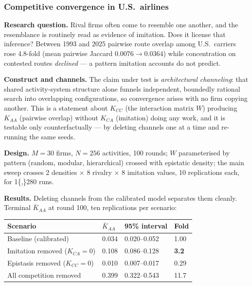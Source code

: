 \documentclass[
]{article}
\newcounter{none} %
\begin{document}
\subsubsection{Competitive convergence in
U.S.~airlines}\label{sec:app-airlines}

\textbf{Research question.} Rival firms often come to resemble one
another, and the resemblance is routinely read as evidence of imitation.
Does it license that inference? Between 1993 and 2025 pairwise route
overlap among U.S.~carriers rose 4.8-fold (mean pairwise Jaccard
\(0.0076 \rightarrow 0.0364\)) while concentration on contested routes
\emph{declined} --- a pattern imitation accounts do not predict.

\textbf{Construct and channels.} The claim under test is
\emph{architectural channeling}: that shared activity-system structure
alone funnels independent, boundedly rational search into overlapping
configurations, so convergence arises with no firm copying another. This
is a statement about \(K_{CC}\) (the interaction matrix \(W\)) producing
\(K_{AA}\) (pairwise overlap) without \(K_{CA}\) (imitation) doing any
work, and it is testable only counterfactually --- by deleting channels
one at a time and re-running the same seeds.

\textbf{Design.} \(M = 30\) firms, \(N = 256\) activities, 100 rounds;
\(W\) parameterised by pattern (random, modular, hierarchical) crossed
with epistatic density; the main sweep crosses 2 densities \(\times\) 8
rivalry \(\times\) 8 imitation values, 10 replications each, for
1\{,\}280 runs.

\textbf{Results.} Deleting channels from the calibrated model separates
them cleanly. Terminal \(\bar K_{AA}\) at round 100, ten replications
per scenario:

{\def\LTcaptype{none} %
\begin{longtable}[]{@{}llll@{}}
\toprule\noalign{}
Scenario & \(\bar K_{AA}\) & 95\% interval & Fold \\
\midrule\noalign{}
\endhead
\bottomrule\noalign{}
\endlastfoot
Baseline (calibrated) & 0.034 & 0.020--0.052 & 1.00 \\
Imitation removed (\(K_{CA} = 0\)) & 0.108 & 0.086--0.128 &
\textbf{3.2} \\
Epistasis removed (\(K_{CC} = 0\)) & 0.010 & 0.007--0.017 & 0.29 \\
All competition removed & 0.399 & 0.322--0.543 & 11.7 \\
\end{longtable}
}
\end{document}
